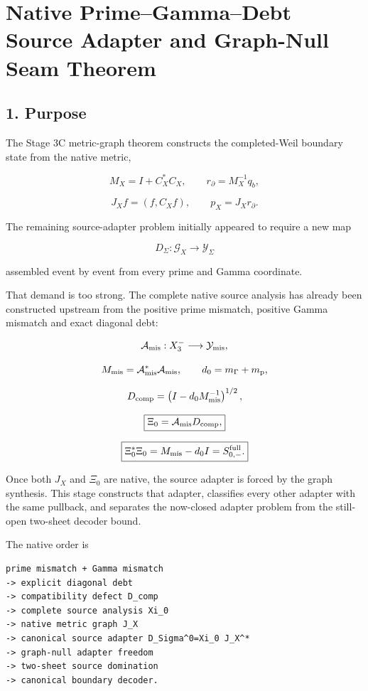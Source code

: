 \hypertarget{native-primegammadebt-source-adapter-and-graph-null-seam-theorem}{%
\chapter{Native Prime--Gamma--Debt Source Adapter and Graph-Null Seam Theorem}\label{native-primegammadebt-source-adapter-and-graph-null-seam-theorem}}

\hypertarget{purpose}{%
\section{1. Purpose}\label{purpose}}

The Stage 3C metric-graph theorem constructs the completed-Weil boundary state
from the native metric,

\[
M_X=I+C_X^*C_X,
\qquad
r_\partial=M_X^{-1}q_b,
\]

\[
J_Xf=(f,C_Xf),
\qquad
p_X=J_Xr_\partial.
\]

The remaining source-adapter problem initially appeared to require a new map

\[
D_\Sigma:\mathcal G_X\longrightarrow\mathcal Y_\Sigma
\]

assembled event by event from every prime and Gamma coordinate.

That demand is too strong. The complete native source analysis has already
been constructed upstream from the positive prime mismatch, positive Gamma
mismatch and exact diagonal debt:

\[
\mathcal A_{\rm mis}:
X_3^-\longrightarrow\mathcal Y_{\rm mis},
\]

\[
M_{\rm mis}=\mathcal A_{\rm mis}^*\mathcal A_{\rm mis},
\qquad
d_0=m_\Gamma+m_{\rm p},
\]

\[
D_{\rm comp}
=
\left(I-d_0M_{\rm mis}^{-1}\right)^{1/2},
\]

\[
\boxed{
\Xi_0=\mathcal A_{\rm mis}D_{\rm comp},
}
\]

\[
\boxed{
\Xi_0^*\Xi_0
=
M_{\rm mis}-d_0I
=
S_{0,-}^{\rm full}.
}
\]

Once both \(J_X\) and \(\Xi_0\) are native, the source adapter is forced by the
graph synthesis. This stage constructs that adapter, classifies every other
adapter with the same pullback, and separates the now-closed adapter problem
from the still-open two-sheet decoder bound.

The native order is

\begin{verbatim}
prime mismatch + Gamma mismatch
-> explicit diagonal debt
-> compatibility defect D_comp
-> complete source analysis Xi_0
-> native metric graph J_X
-> canonical source adapter D_Sigma^0=Xi_0 J_X^*
-> graph-null adapter freedom
-> two-sheet source domination
-> canonical boundary decoder.
\end{verbatim}

